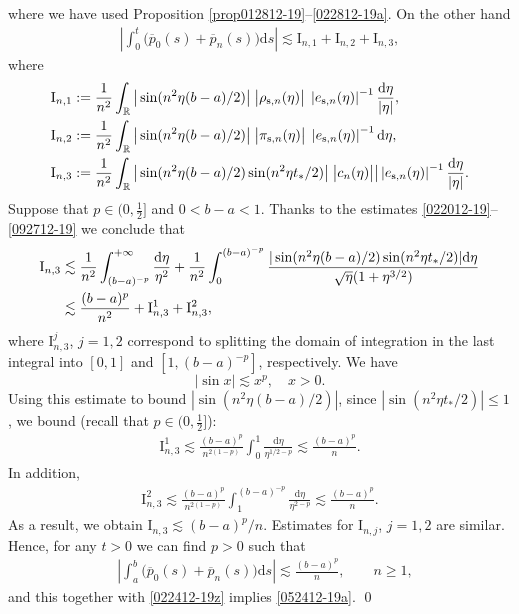 \documentclass[EJP]{ejpecp} %
\newcommand\R{{\mathbb R}}
\renewcommand{\ge}{\geqslant}
\renewcommand{\le}{\leqslant}
\newcommand{\dd  }{\mathrm{d}}
\renewcommand{\bar}{\overline}
\numberwithin{equation}{section}
\begin{document}
where we have used Proposition \ref{prop012812-19}--\eqref{022812-19a}.
On the other hand
\begin{align}
\label{032412-19z}
\left|\int_0^t\big(\bar p_0(s)+\bar p_n(s)\big)\dd s\right|\lesssim \mathrm{I}_{n,1}+\mathrm{I}_{n,2}+\mathrm{I}_{n,3},
\end{align}
where
\begin{align*}
\mathrm{I}_{n,1}&:= \frac{1}{n^2}\int_{\R}\big|\sin(n^2\eta (b-a)/2)\big|\; \big|\rho_{{\rm s},n}(\eta)
  \big|\; \left|e_{{\rm s},n}(\eta)\right|^{-1}\frac{\dd\eta }{|\eta|},\\
\mathrm{I}_{n,2}&:=\frac{1}{n^2}\int_{\R}\big|\sin(n^2\eta (b-a)/2)\big|\; \big|\pi_{{\rm s},n}(\eta) \big|\; \left|e_{{\rm s},n} (\eta)\right|^{-1}\dd\eta,\\
\mathrm{I}_{n,3}&:=\frac{1}{n^2}\int_{\R}\big|\sin(n^2\eta (b-a)/2)\sin(n^2\eta t_*/2)\big|\;\big|c_n(\eta)
  \big|\big|\left|e_{{\rm s},n} (\eta)\right|^{-1}\frac{\dd\eta }{|\eta|}.
\end{align*}
Suppose that $p\in(0,\frac12]$ and $0<b-a<1$. Thanks to the estimates \eqref{022012-19}--\eqref{092712-19} we conclude that
\begin{align}
\label{032412-19az}
\mathrm{I}_{n,3}&\lesssim 
 \frac{1}{n^2}\int_{(b-a)^{-p}}^{+\infty}\frac{\dd\eta }{\eta^{2}}
+\frac{1}{n^2}\int_{0}^{(b-a)^{-p}}\frac{|\sin(n^2\eta (b-a)/2)\sin(n^2\eta
  t_*/2)|\dd\eta}{\sqrt{\eta}(1+\eta^{3/2})}\notag\\
&
\lesssim \frac{ (b-a)^{p}}{n^2}+\mathrm{I}_{n,3}^1+\mathrm{I}_{n,3}^2,
\end{align}
where $\mathrm{I}_{n,3}^j$, $j=1,2$ correspond to splitting the domain of integration
in the last integral into $[0,1]$ and $[1, (b-a)^{-p}]$, respectively.
We have
$$
|\sin x|\lesssim x^p,\quad x>0.
$$
Using this estimate to bound $|\sin(n^2\eta (b-a)/2)|$,
since $|\sin(n^2\eta
  t_*/2)|\le 1$, we bound  (recall that $p\in(0,\frac12]$):
\begin{align}
\label{032412-19azz1}
\mathrm{I}_{n,3}^1\lesssim \frac{(b-a)^p}{n^{2(1-p)}}\int_{0}^{1}\frac{\dd\eta
  }{\eta^{1/2-p}}
\lesssim 
  \frac{(b-a)^p}{n}.
\end{align}
In addition,
\begin{align}
\label{032412-19azz2}
\mathrm{I}_{n,3}^2\lesssim \frac{(b-a)^{p}}{n^{2(1-p)}}\int_{1}^{(b-a)^{-p}}\frac{\dd\eta
  }{\eta^{2-p}}
\lesssim 
  \frac{(b-a)^p}{n}.
\end{align}
As a result, we obtain
$
\mathrm{I}_{n,3}
\lesssim 
  (b-a)^p/n.
$
Estimates for $\mathrm{I}_{n,j}$, $j=1,2$ are similar. 
Hence, for any $t>0$ we can find $p>0$ such that
\begin{align}
\label{012812-19}
&\left|\int_a^b \big(\bar p_0(s)+\bar p_n(s)\big)\dd s\right|\lesssim
  \frac{(b-a)^p}{n},\qquad n\ge1,
\end{align}
and this together with \eqref{022412-19z} implies  \eqref{052412-19a}.
\qed
\end{document}
